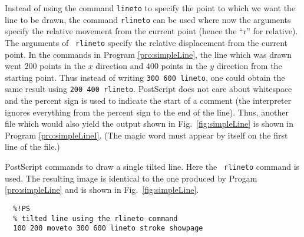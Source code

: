 Instead of using the command {\tt lineto} to specify the point to
which we want the line to be drawn, the command {\tt rlineto} can be
used where now the arguments specify the relative movement from the
current point (hence the ``r'' for relative).  The arguments of {\tt
rlineto} specify the relative displacement from the current point.  In
the commands in Program \ref{pro:simpleLine}, the line which was drawn
went $200$ points in the $x$ direction and $400$ points in the $y$
direction from the starting point.  Thus instead of writing {\tt 300
600 lineto}, one could obtain the same result using {\tt 200 400
rlineto}.  PostScript does not care about whitespace and the percent
sign is used to indicate the start of a comment (the interpreter
ignores everything from the percent sign to the end of the line).
Thus, another file which would also yield the output shown in Fig.\
\ref{fig:simpleLine} is shown in Program \ref{pro:simpleLineI}.
(The magic word must appear by itself on the first line of the file.)
\begin{program}
PostScript commands to draw a single tilted line.  Here the {\tt
rlineto} command is used.  The resulting image is identical to the one
produced by Progam \ref{pro:simpleLine} and is shown in Fig.\
\ref{fig:simpleLine}.  \label{pro:simpleLineI}
\codemiddle
\begin{verbatim}
  %!PS
  % tilted line using the rlineto command
  100 200 moveto 300 600 lineto stroke showpage
\end{verbatim}
\end{program}

